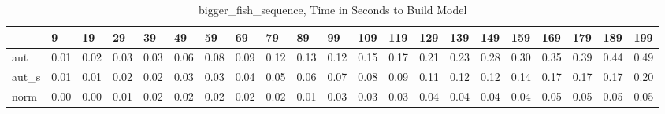 \begin{table}
\caption{bigger_fish_sequence, Time in Seconds to Build Model}
\label{bigger_fish_sequence_model_time}
\begin{tabular}{lllllllllllllllllllll}
\toprule
 & 9 & 19 & 29 & 39 & 49 & 59 & 69 & 79 & 89 & 99 & 109 & 119 & 129 & 139 & 149 & 159 & 169 & 179 & 189 & 199 \\
\midrule
aut & 0.01 & 0.02 & 0.03 & 0.03 & 0.06 & 0.08 & 0.09 & 0.12 & 0.13 & 0.12 & 0.15 & 0.17 & 0.21 & 0.23 & 0.28 & 0.30 & 0.35 & 0.39 & 0.44 & 0.49 \\
aut_s & 0.01 & 0.01 & 0.02 & 0.02 & 0.03 & 0.03 & 0.04 & 0.05 & 0.06 & 0.07 & 0.08 & 0.09 & 0.11 & 0.12 & 0.12 & 0.14 & 0.17 & 0.17 & 0.17 & 0.20 \\
norm & 0.00 & 0.00 & 0.01 & 0.02 & 0.02 & 0.02 & 0.02 & 0.02 & 0.01 & 0.03 & 0.03 & 0.03 & 0.04 & 0.04 & 0.04 & 0.04 & 0.05 & 0.05 & 0.05 & 0.05 \\
\bottomrule
\end{tabular}
\end{table}
